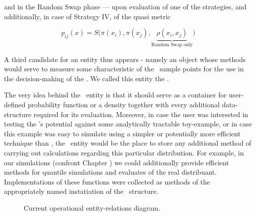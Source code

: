 and in the Random Swap phase --- upon evaluation of one of the strategies, and additionally, in case of Strategy IV, of the quasi metric	

\begin{equation*}
	p_{ij}(x) = S\Big(\pi(x_i),\pi(x_j), \underbrace{\rho(x_i, x_j)}_\text{Random Swap only}\Big)
\end{equation*}

 A third candidate for an entity thus appears - namely an object whose methods would serve to measure some characteristic of the \sspace\, sample points for the use in the decision-making of the \algo. We called this entity the \measure. 

The very idea behind the \measure\, entity is that it should serve as a container for user-defined probability function or a density together with every additional data-structure required for its evaluation. Moreover, in case the user was interested in testing the \PTalgo's potential against some analytically tractable toy-example, or in case this example was easy to simulate using a simpler or potentially more efficient technique than \mcmc, the \measure\,
 entity would be the place to store any additional method of carrying out calculations regarding this particular distribution. For example, in our simulations (confront Chapter ) we could  additionally provide efficient methods for quantile simulations and evaluates of the real distribuant. Implementations of these functions were collected as methods of the appropriately named instatiation of the \measure\, structure.  



\begin{figure}
	\caption{Current operational entity-relations diagram.}\label{objectStructure}
\end{figure}


